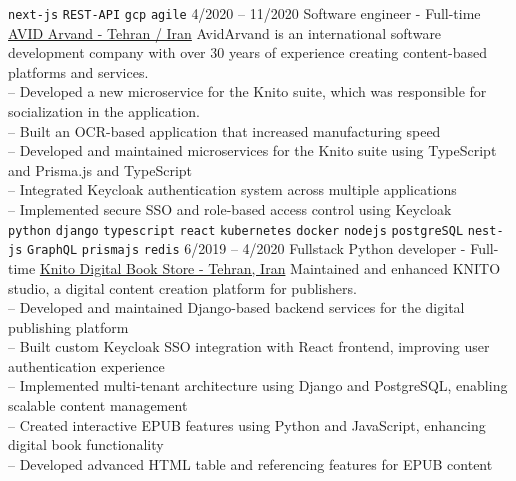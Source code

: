 \begin{entrylist}
{        \texttt{next-js}\slashsep
        \texttt{REST-API}\slashsep
        \texttt{gcp}\slashsep
        \texttt{agile}\slashsep
    }
    \entry
    {4/2020 -- 11/2020}
    {Software engineer - Full-time}
    {
        \href{https://www.linkedin.com/company/avid-technology-development/}{AVID Arvand - Tehran / Iran}}
    {
        AvidArvand is an international software development company with over 30 years of experience creating content-based platforms and services. \\
        -- Developed a new microservice for the Knito suite, which was responsible for socialization in the application.\\
        -- Built an OCR-based application that increased manufacturing speed \\
        -- Developed and maintained microservices for the Knito suite using TypeScript and Prisma.js and TypeScript \\
        -- Integrated Keycloak authentication system across multiple applications \\
        -- Implemented secure SSO and role-based access control using Keycloak \\
        \texttt{python}\slashsep
        \texttt{django}\slashsep
        \texttt{typescript}\slashsep
        \texttt{react}\slashsep
        \texttt{kubernetes}\slashsep
        \texttt{docker}\slashsep
        \texttt{nodejs}\slashsep
        \texttt{postgreSQL}\slashsep
        \texttt{nest-js}\slashsep
        \texttt{GraphQL}\slashsep
        \texttt{prismajs}\slashsep
        \texttt{redis}\slashsep
    }
    \entry
    {6/2019 -- 4/2020}
    {Fullstack Python developer - Full-time}
    {
        \href{https://knito.com/}{Knito Digital Book Store - Tehran, Iran}}
    {
        Maintained and enhanced KNITO studio, a digital content creation platform for publishers. \\
        -- Developed and maintained Django-based backend services for the digital publishing platform \\
        -- Built custom Keycloak SSO integration with React frontend, improving user authentication experience \\
        -- Implemented multi-tenant architecture using Django and PostgreSQL, enabling scalable content management \\
        -- Created interactive EPUB features using Python and JavaScript, enhancing digital book functionality \\
        -- Developed advanced HTML table and referencing features for EPUB content \\
}
\end{entrylist}

